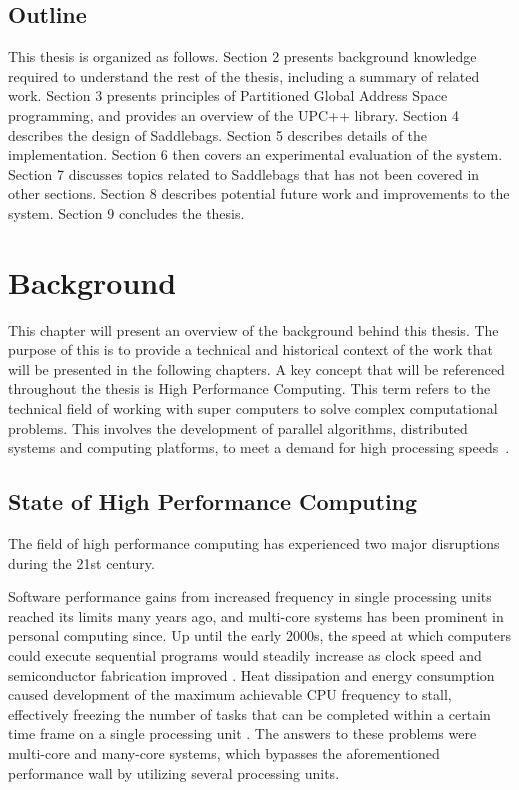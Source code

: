 \documentclass{uit-report}
\begin{document}


\section{Outline}
This thesis is organized as follows. Section 2 presents background knowledge required to understand the rest of the thesis, including a summary of related work. Section 3 presents principles of Partitioned Global Address Space programming, and provides an overview of the UPC++ library. Section 4 describes the design of Saddlebags. Section 5 describes details of the implementation. Section 6 then covers an experimental evaluation of the system. Section 7 discusses topics related to Saddlebags that has not been covered in other sections. Section 8 describes potential future work and improvements to the system. Section 9 concludes the thesis.

\newpage
\chapter{Background}
This chapter will present an overview of the background behind this thesis. The purpose of this is to provide a technical and historical context of the work that will be presented in the following chapters. A key concept that will be referenced throughout the thesis is High Performance Computing. This term refers to the technical field of working with super computers to solve complex computational problems. This involves the development of parallel algorithms, distributed systems and computing platforms, to meet a demand for high processing speeds~\cite{hpc_def}.

%  
\section{State of High Performance Computing}
The field of high performance computing has experienced two major disruptions during the 21st century.

Software performance gains from increased frequency in single processing units reached its limits many years ago, and multi-core systems has been prominent in personal computing since. Up until the early 2000s, the speed at which computers could execute sequential programs would steadily increase as clock speed and semiconductor fabrication improved \cite{sutter_larus_2005}. Heat dissipation and energy consumption caused development of the maximum achievable CPU frequency to stall, effectively freezing the number of tasks that can be completed within a certain time frame on a single processing unit \cite{diaz_munoz-caro_nino_2012}. The answers to these problems were multi-core and many-core systems, which bypasses the aforementioned performance wall by utilizing several processing units.
\end{document}
